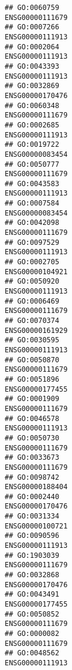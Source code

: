 \documentclass[
]{article}
\begin{document}
\begin{verbatim}
## GO:0060759                                                 ENSG00000111679
## GO:0007266                                                 ENSG00000111913
## GO:0002064                                                 ENSG00000111913
## GO:0043393                                                 ENSG00000111913
## GO:0032869                                                 ENSG00000170476
## GO:0060348                                                 ENSG00000111679
## GO:0002685                                                 ENSG00000111913
## GO:0019722                                                 ENSG00000083454
## GO:0050777                                                 ENSG00000111679
## GO:0043583                                                 ENSG00000111913
## GO:0007584                                                 ENSG00000083454
## GO:0042098                                                 ENSG00000111679
## GO:0097529                                                 ENSG00000111913
## GO:0002705                                                 ENSG00000104921
## GO:0050920                                                 ENSG00000111913
## GO:0006469                                                 ENSG00000111679
## GO:0070374                                                 ENSG00000161929
## GO:0030595                                                 ENSG00000111913
## GO:0050870                                                 ENSG00000111679
## GO:0051896                                                 ENSG00000177455
## GO:0001909                                                 ENSG00000111679
## GO:0046578                                                 ENSG00000111913
## GO:0050730                                                 ENSG00000111679
## GO:0033673                                                 ENSG00000111679
## GO:0098742                                                 ENSG00000188404
## GO:0002440                                                 ENSG00000170476
## GO:0031334                                                 ENSG00000100721
## GO:0090596                                                 ENSG00000111913
## GO:1903039                                                 ENSG00000111679
## GO:0032868                                                 ENSG00000170476
## GO:0043491                                                 ENSG00000177455
## GO:0050852                                                 ENSG00000111679
## GO:0000082                                                 ENSG00000111679
## GO:0048562                                                 ENSG00000111913

\end{verbatim}
\end{document}
